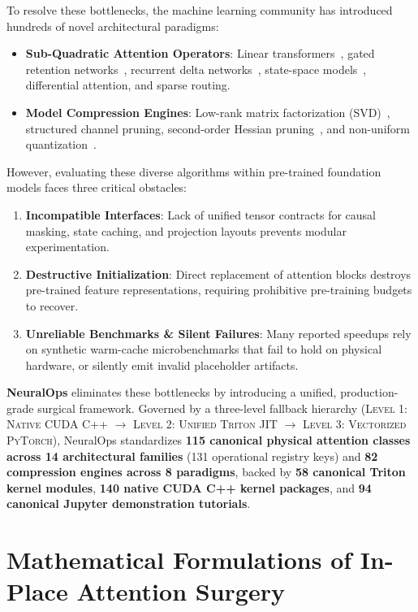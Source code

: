 \documentclass{article}
\begin{document}
To resolve these bottlenecks, the machine learning community has introduced hundreds of novel architectural paradigms:
\begin{itemize}
    \item \textbf{Sub-Quadratic Attention Operators}: Linear transformers~\citep{katharopoulos2020transformers}, gated retention networks~\citep{sun2023retentive}, recurrent delta networks~\citep{schlag2021deltanet}, state-space models~\citep{gu2023mamba}, differential attention, and sparse routing.
    \item \textbf{Model Compression Engines}: Low-rank matrix factorization (SVD)~\citep{hu2022lora}, structured channel pruning, second-order Hessian pruning~\citep{frantar2023sparsegpt}, and non-uniform quantization~\citep{dettmers2022llmint8,frantar2023gptq}.
\end{itemize}

However, evaluating these diverse algorithms within pre-trained foundation models faces three critical obstacles:
\begin{enumerate}
    \item \textbf{Incompatible Interfaces}: Lack of unified tensor contracts for causal masking, state caching, and projection layouts prevents modular experimentation.
    \item \textbf{Destructive Initialization}: Direct replacement of attention blocks destroys pre-trained feature representations, requiring prohibitive pre-training budgets to recover.
    \item \textbf{Unreliable Benchmarks \& Silent Failures}: Many reported speedups rely on synthetic warm-cache microbenchmarks that fail to hold on physical hardware, or silently emit invalid placeholder artifacts.
\end{enumerate}

\textbf{NeuralOps} eliminates these bottlenecks by introducing a unified, production-grade surgical framework. Governed by a three-level fallback hierarchy (\textsc{Level 1: Native CUDA C++} $\to$ \textsc{Level 2: Unified Triton JIT} $\to$ \textsc{Level 3: Vectorized PyTorch}), NeuralOps standardizes \textbf{115 canonical physical attention classes across 14 architectural families} (131 operational registry keys) and \textbf{82 compression engines across 8 paradigms}, backed by \textbf{58 canonical Triton kernel modules}, \textbf{140 native CUDA C++ kernel packages}, and \textbf{94 canonical Jupyter demonstration tutorials}.

\section{Mathematical Formulations of In-Place Attention Surgery}
\label{sec:math_formulations}
\end{document}
